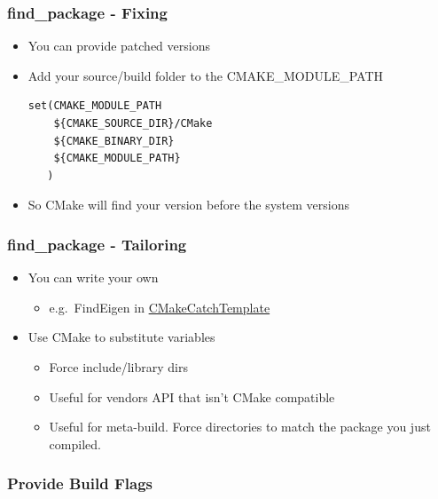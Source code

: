 \subsubsection{find\_package - Fixing}\label{findux5fpackage---fixing}

\begin{itemize}
\item
  You can provide patched versions
\item
  Add your source/build folder to the CMAKE\_MODULE\_PATH

\begin{verbatim}
set(CMAKE_MODULE_PATH
    ${CMAKE_SOURCE_DIR}/CMake
    ${CMAKE_BINARY_DIR}
    ${CMAKE_MODULE_PATH}
   )
\end{verbatim}
\item
  So CMake will find your version before the system versions
\end{itemize}

\subsubsection{find\_package -
Tailoring}\label{findux5fpackage---tailoring}

\begin{itemize}
\itemsep1pt\parskip0pt
\item
  You can write your own

  \begin{itemize}
  \itemsep1pt\parskip0pt
  \item
    e.g.~FindEigen in
    \href{https://github.com/MattClarkson/CMakeCatchTemplate/blob/master/CMake/FindEigen.cmake}{CMakeCatchTemplate}
  \end{itemize}
\item
  Use CMake to substitute variables

  \begin{itemize}
  \itemsep1pt\parskip0pt
  \item
    Force include/library dirs
  \item
    Useful for vendors API that isn't CMake compatible
  \item
    Useful for meta-build. Force directories to match the package you
    just compiled.
  \end{itemize}
\end{itemize}

\subsubsection{Provide Build Flags}\label{provide-build-flags}


